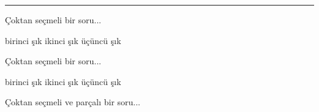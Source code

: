 \documentclass[12 pt]{exam}
\begin{document}
\smallskip

\hrule


\begin{questions}



\question[**] Çoktan seçmeli bir soru... %

\begin{oneparchoices}
\choice birinci şık
\CorrectChoice ikinci şık %
\choice üçüncü şık %
\end{oneparchoices}


\question[**] Çoktan seçmeli bir soru...

\begin{choices}
\choice birinci şık
\CorrectChoice ikinci şık
\choice üçüncü şık
\end{choices}


\question Çoktan seçmeli ve parçalı bir soru...

\end{questions}
\end{document}

